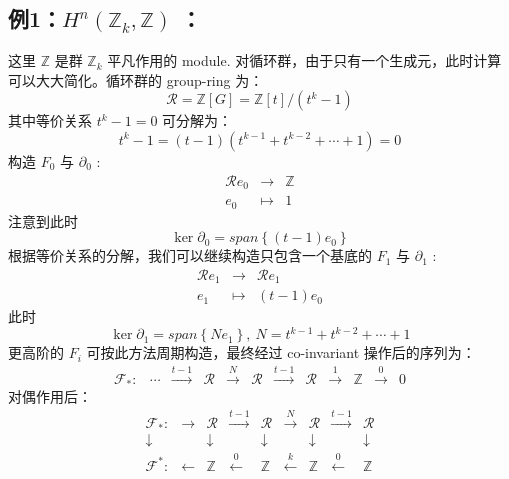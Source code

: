 \documentclass[UTF8]{ctexart}
\begin{document}
\subsection*{例1：$H^{n}\left(\mathbb{Z}_{k},\mathbb{Z}\right)$ ：}
\noindent
这里 $\mathbb{Z}$ 是群 $\mathbb{Z}_{k}$ 平凡作用的 module. 对循环群，由于只有一个生成元，此时计算可以大大简化。循环群的
group-ring 为：
\begin{equation}
\mathcal{R}=\mathbb{Z}\left[G\right]=\mathbb{Z}\left[t\right]/\left(t^{k}-1\right)
\end{equation}
其中等价关系 $t^{k}-1=0$ 可分解为：
\begin{equation}
t^{k}-1=\left(t-1\right)\left(t^{k-1}+t^{k-2}+\cdots+1\right)=0
\end{equation}
构造 $F_{0}$ 与 $\partial_{0}$ :
\begin{eqnarray}
\mathcal{R}e_{0} & \rightarrow & \mathbb{Z}\\
e_{0} & \mapsto & 1
\end{eqnarray}
注意到此时
\begin{equation}
\ker\partial_{0}=span\left\{ \left(t-1\right)e_{0}\right\} 
\end{equation}
根据等价关系的分解，我们可以继续构造只包含一个基底的 $F_{1}$ 与 $\partial_{1}$ :
\begin{eqnarray}
\mathcal{R}e_{1} & \rightarrow & \mathcal{R}e_{1}\\
e_{1} & \mapsto & \left(t-1\right)e_{0}
\end{eqnarray}
此时
\begin{equation}
\ker\partial_{1}=span\left\{ Ne_{1}\right\} ,\ N=t^{k-1}+t^{k-2}+\cdots+1
\end{equation}
更高阶的 $F_{i}$ 可按此方法周期构造，最终经过 co-invariant 操作后的序列为：
\begin{equation}
\begin{array}{cccccccccccc}
\mathcal{F}_{*}: & \cdots & \stackrel{t-1}{\longrightarrow} & \mathcal{R} & \stackrel{N}{\longrightarrow} & {\displaystyle \mathcal{R}} & \stackrel{t-1}{\longrightarrow} & \mathcal{R} & \stackrel{1}{\longrightarrow} & \mathbb{Z} & \stackrel{0}{\longrightarrow} & 0\end{array}
\end{equation}
对偶作用后：
\begin{equation}
\begin{array}{ccccccccc}
\mathcal{F}_{*}: & \rightarrow & \mathcal{R} & \stackrel{t-1}{\longrightarrow} & \mathcal{R} & \stackrel{N}{\longrightarrow} & \mathcal{R} & \stackrel{t-1}{\longrightarrow} & \mathcal{R}\\
\downarrow &  & \downarrow &  & \downarrow &  & \downarrow &  & \downarrow\\
\mathcal{F}^{*}: & \leftarrow & \mathbb{Z} & \stackrel{0}{\longleftarrow} & \mathbb{Z} & \stackrel{k}{\longleftarrow} & \mathbb{Z} & \stackrel{0}{\longleftarrow} & \mathbb{Z}
\end{array}
\end{equation}
\end{document}
